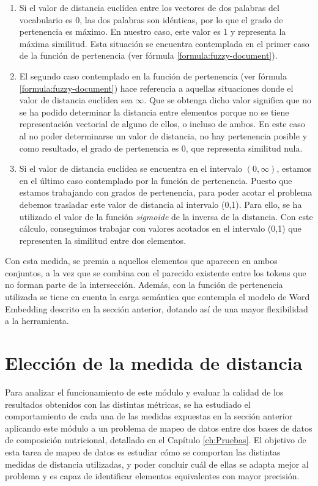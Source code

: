 \begin{enumerate}
    \item Si el valor de distancia euclídea entre los vectores de dos palabras del vocabulario es 0, las dos palabras son idénticas, por lo que el grado de pertenencia es máximo. En nuestro caso, este valor es 1 y representa la máxima similitud. Esta situación se encuentra contemplada en el primer caso de la función de pertenencia (ver fórmula \ref{formula:fuzzy-document}).
    
    \item El segundo caso contemplado en la función de pertenencia (ver fórmula \ref{formula:fuzzy-document}) hace referencia a aquellas situaciones donde el valor de distancia euclídea sea $\infty$. Que se obtenga dicho valor significa que no se ha podido determinar la distancia entre elementos porque no se tiene representación vectorial de alguno de ellos, o incluso de ambos. En este caso al no poder determinarse un valor de distancia, no hay pertenencia posible y como resultado, el grado de pertenencia es 0, que representa similitud nula.
    
    \item Si el valor de distancia euclídea se encuentra en el intervalo $(0,\infty)$, estamos en el último caso contemplado por la función de pertenencia. Puesto que estamos trabajando con grados de pertenencia, para poder acotar el problema debemos trasladar este valor de distancia al intervalo (0,1). Para ello, se ha utilizado el valor de la función \textit{sigmoide} de la inversa de la distancia. Con este cálculo, conseguimos trabajar con valores acotados en el intervalo (0,1) que representen la similitud entre dos elementos. 
\end{enumerate}


Con esta medida, se premia a aquellos elementos que aparecen en ambos conjuntos, a la vez que se combina con el parecido existente entre los tokens que no forman parte de la intersección. Además, con la función de pertenencia utilizada se tiene en cuenta la carga semántica que contempla el modelo de Word Embedding descrito en la sección anterior, dotando así de una mayor flexibilidad a la herramienta. 

\section{Elección de la medida de distancia}

Para analizar el funcionamiento de este módulo y evaluar la calidad de los resultados obtenidos con las distintas métricas, se ha estudiado el comportamiento de cada una de las medidas expuestas en la sección anterior aplicando este módulo a un problema de mapeo de datos entre dos bases de datos de composición nutricional, detallado en el Capítulo \ref{ch:Pruebas}. El objetivo de esta tarea de mapeo de datos es estudiar cómo se comportan las distintas medidas de distancia utilizadas, y poder concluir cuál de ellas se adapta mejor al problema y es capaz de identificar elementos equivalentes con mayor precisión. 
